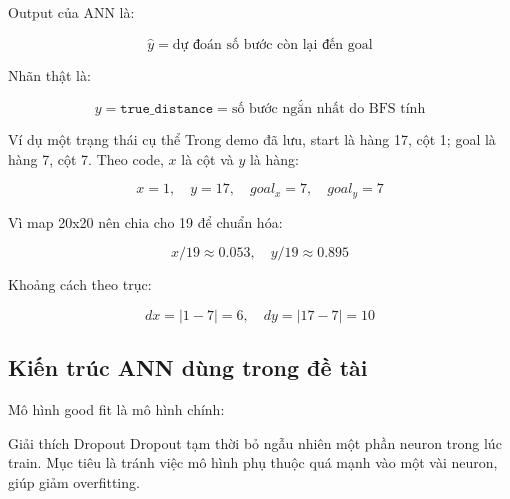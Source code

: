 \documentclass[12pt,a4paper]{article}
\newcommand{\code}[1]{\texttt{#1}}
\begin{document}
Output của ANN là:

\[
    \hat{y} = \text{dự đoán số bước còn lại đến goal}
\]

Nhãn thật là:

\[
    y = \code{true\_distance} = \text{số bước ngắn nhất do BFS tính}
\]

\begin{teachbox}{Ví dụ một trạng thái cụ thể}
Trong demo đã lưu, start là hàng 17, cột 1; goal là hàng 7, cột 7. Theo code, \(x\) là cột và \(y\) là hàng:

\[
    x=1,\quad y=17,\quad goal_x=7,\quad goal_y=7
\]

Vì map 20x20 nên chia cho 19 để chuẩn hóa:

\[
    x/19 \approx 0.053,\quad y/19 \approx 0.895
\]

Khoảng cách theo trục:

\[
    dx=|1-7|=6,\quad dy=|17-7|=10
\]
\end{teachbox}

\subsection{Kiến trúc ANN dùng trong đề tài}

Mô hình good fit là mô hình chính:

\begin{center}
\end{center}

\begin{teachbox}{Giải thích Dropout}
Dropout tạm thời bỏ ngẫu nhiên một phần neuron trong lúc train. Mục tiêu là tránh việc mô hình phụ thuộc quá mạnh vào một vài neuron, giúp giảm overfitting.
\end{teachbox}
\end{document}
